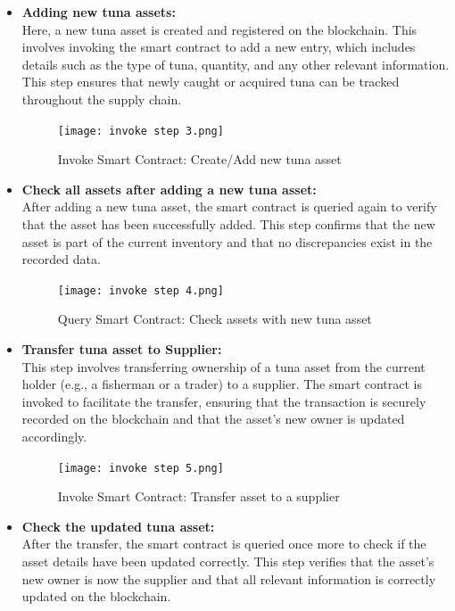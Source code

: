 \begin{itemize}
	\item \textbf{Adding new tuna assets:}\\
	Here, a new tuna asset is created and registered on the blockchain. This involves invoking the smart contract to add a new entry, which includes details such as the type of tuna, quantity, and any other relevant information. This step ensures that newly caught or acquired tuna can be tracked throughout the supply chain.
	
	\begin{figure}[H]
		\centering
		\texttt{[image: invoke step 3.png]}
		\caption{Invoke Smart Contract: Create/Add new tuna asset}
		\label{fig: third step}
	\end{figure}
	
	\item \textbf{Check all assets after adding a new tuna asset:}\\
	After adding a new tuna asset, the smart contract is queried again to verify that the asset has been successfully added. This step confirms that the new asset is part of the current inventory and that no discrepancies exist in the recorded data.
	
	\begin{figure}[H]
		\centering
		\texttt{[image: invoke step 4.png]}
		\caption{Query Smart Contract: Check assets with new tuna asset}
		\label{fig: fourth step}
	\end{figure}
	
	\item \textbf{Transfer tuna asset to Supplier:}\\
	This step involves transferring ownership of a tuna asset from the current holder (e.g., a fisherman or a trader) to a supplier. The smart contract is invoked to facilitate the transfer, ensuring that the transaction is securely recorded on the blockchain and that the asset’s new owner is updated accordingly.
	
	\begin{figure}[H]
		\centering
		\texttt{[image: invoke step 5.png]}
		\caption{Invoke Smart Contract: Transfer asset to a supplier}
		\label{fig: fifth step}
	\end{figure}
	
	\item \textbf{Check the updated tuna asset:}\\
	After the transfer, the smart contract is queried once more to check if the asset details have been updated correctly. This step verifies that the asset’s new owner is now the supplier and that all relevant information is correctly updated on the blockchain.
	

\end{itemize}
